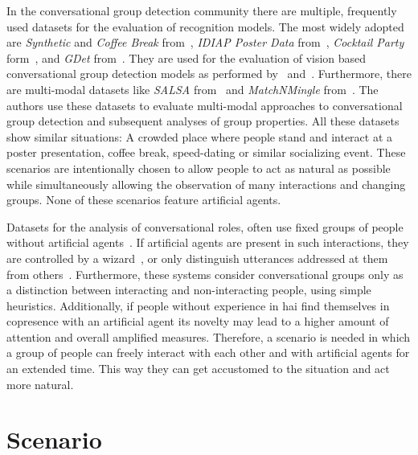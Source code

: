 In the \gls{conversational group} detection community there are multiple, frequently used datasets for the evaluation of recognition models.
The most widely adopted are \emph{Synthetic} and \emph{Coffee Break} from~, \emph{IDIAP Poster Data} from~, \emph{Cocktail Party} form~, and \emph{GDet} from~.
They are used for the evaluation of vision based \gls{conversational group} detection models as performed by~ and~.
Furthermore, there are multi-modal datasets like \emph{SALSA} from~ and \emph{MatchNMingle} from~.
The authors use these datasets to evaluate multi-modal approaches to \gls{conversational group} detection and subsequent analyses of group properties.
All these datasets show similar situations:
A crowded place where people stand and interact at a poster presentation, coffee break, speed-dating or similar socializing event.
These scenarios are intentionally chosen to allow people to act as natural as possible while simultaneously allowing the observation of many interactions and changing groups.
None of these scenarios feature \glspl{artificial agent}.

Datasets for the analysis of \glspl{conversational role}, often use fixed groups of people without \glspl{artificial agent}~\cite{Jovanovic2006,Akhtiamov2017,Makino2018}.
If \glspl{artificial agent} are present in such interactions, they are controlled by a \gls{wizard}~\cite{VanTurnhout2005,Jayagopi2013a}, or only distinguish utterances addressed at them from others~\cite{Bohus2011,Skantze2014}.
Furthermore, these systems consider \glspl{conversational group} only as a distinction between interacting and non-interacting people, using simple heuristics.
%
Additionally, if people without experience in \gls{hai} find themselves in \gls{copresence} with an \gls{artificial agent} its novelty may lead to a higher amount of attention and overall amplified measures.
Therefore, a scenario is needed in which a group of people can freely interact with each other and with \glspl{artificial agent} for an extended time.
This way they can get accustomed to the situation and act more natural.

\section{Scenario}


